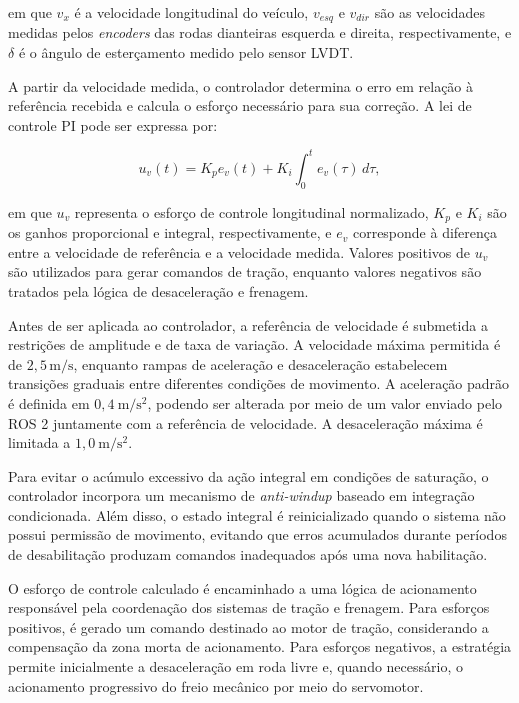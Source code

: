 em que $v_x$ é a velocidade longitudinal do veículo, $v_{esq}$ e $v_{dir}$ são as velocidades medidas pelos \textit{encoders} das rodas dianteiras esquerda e direita, respectivamente, e $\delta$ é o ângulo de esterçamento medido pelo sensor LVDT.

A partir da velocidade medida, o controlador determina o erro em relação à referência recebida e calcula o esforço necessário para sua correção. A lei de controle PI pode ser expressa por:

\begin{equation}
u_v(t) = K_p e_v(t) + K_i \int_0^t e_v(\tau)\,d\tau,
\end{equation}

em que $u_v$ representa o esforço de controle longitudinal normalizado, $K_p$ e $K_i$ são os ganhos proporcional e integral, respectivamente, e $e_v$ corresponde à diferença entre a velocidade de referência e a velocidade medida. Valores positivos de $u_v$ são utilizados para gerar comandos de tração, enquanto valores negativos são tratados pela lógica de desaceleração e frenagem.

Antes de ser aplicada ao controlador, a referência de velocidade é submetida a restrições de amplitude e de taxa de variação. A velocidade máxima permitida é de $2{,}5\,\mathrm{m/s}$, enquanto rampas de aceleração e desaceleração estabelecem transições graduais entre diferentes condições de movimento. A aceleração padrão é definida em $0{,}4~\mathrm{m/s^2}$, podendo ser alterada por meio de um valor enviado pelo ROS 2 juntamente com a referência de velocidade. A desaceleração máxima é limitada a $1{,}0~\mathrm{m/s^2}$. 

Para evitar o acúmulo excessivo da ação integral em condições de saturação, o controlador incorpora um mecanismo de \textit{anti-windup} baseado em integração condicionada. Além disso, o estado integral é reinicializado quando o sistema não possui permissão de movimento, evitando que erros acumulados durante períodos de desabilitação produzam comandos inadequados após uma nova habilitação.

O esforço de controle calculado é encaminhado a uma lógica de acionamento responsável pela coordenação dos sistemas de tração e frenagem. Para esforços positivos, é gerado um comando destinado ao motor de tração, considerando a compensação da zona morta de acionamento. Para esforços negativos, a estratégia permite inicialmente a desaceleração em roda livre e, quando necessário, o acionamento progressivo do freio mecânico por meio do servomotor.

